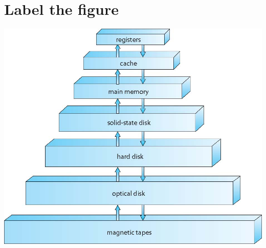 \documentclass{article}
\begin{document}
\section{Label the figure}
\includegraphics{memory}
\end{document}
